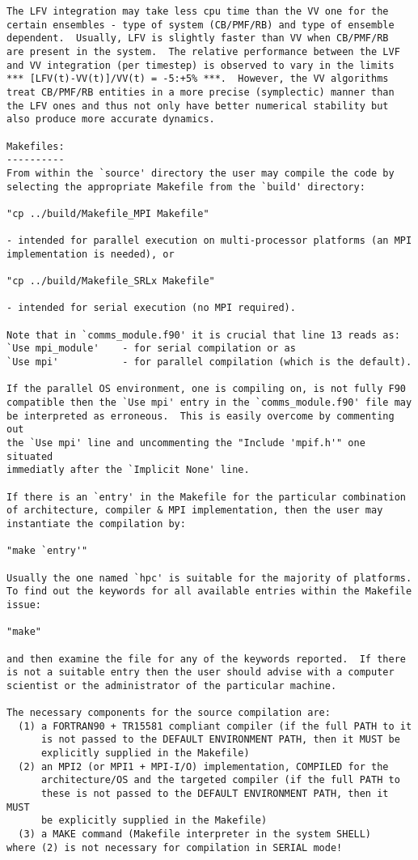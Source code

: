 \begin{verbatim}
The LFV integration may take less cpu time than the VV one for the
certain ensembles - type of system (CB/PMF/RB) and type of ensemble
dependent.  Usually, LFV is slightly faster than VV when CB/PMF/RB
are present in the system.  The relative performance between the LVF
and VV integration (per timestep) is observed to vary in the limits
*** [LFV(t)-VV(t)]/VV(t) = -5:+5% ***.  However, the VV algorithms
treat CB/PMF/RB entities in a more precise (symplectic) manner than
the LFV ones and thus not only have better numerical stability but
also produce more accurate dynamics.

Makefiles:
----------
From within the `source' directory the user may compile the code by
selecting the appropriate Makefile from the `build' directory:

"cp ../build/Makefile_MPI Makefile"

- intended for parallel execution on multi-processor platforms (an MPI
implementation is needed), or

"cp ../build/Makefile_SRLx Makefile"

- intended for serial execution (no MPI required).

Note that in `comms_module.f90' it is crucial that line 13 reads as:
`Use mpi_module'    - for serial compilation or as
`Use mpi'           - for parallel compilation (which is the default).

If the parallel OS environment, one is compiling on, is not fully F90
compatible then the `Use mpi' entry in the `comms_module.f90' file may
be interpreted as erroneous.  This is easily overcome by commenting out
the `Use mpi' line and uncommenting the "Include 'mpif.h'" one situated
immediatly after the `Implicit None' line.

If there is an `entry' in the Makefile for the particular combination
of architecture, compiler & MPI implementation, then the user may
instantiate the compilation by:

"make `entry'"

Usually the one named `hpc' is suitable for the majority of platforms.
To find out the keywords for all available entries within the Makefile
issue:

"make"

and then examine the file for any of the keywords reported.  If there
is not a suitable entry then the user should advise with a computer
scientist or the administrator of the particular machine.

The necessary components for the source compilation are:
  (1) a FORTRAN90 + TR15581 compliant compiler (if the full PATH to it
      is not passed to the DEFAULT ENVIRONMENT PATH, then it MUST be
      explicitly supplied in the Makefile)
  (2) an MPI2 (or MPI1 + MPI-I/O) implementation, COMPILED for the
      architecture/OS and the targeted compiler (if the full PATH to
      these is not passed to the DEFAULT ENVIRONMENT PATH, then it MUST
      be explicitly supplied in the Makefile)
  (3) a MAKE command (Makefile interpreter in the system SHELL)
where (2) is not necessary for compilation in SERIAL mode!


\end{verbatim}
